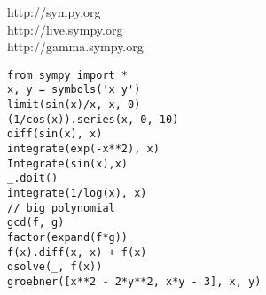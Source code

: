 \documentclass{article}
\begin{document}
\LARGE

\noindent
http://sympy.org \\
http://live.sympy.org \\
http://gamma.sympy.org \\

\begin{verbatim}
from sympy import *
x, y = symbols('x y')
limit(sin(x)/x, x, 0)
(1/cos(x)).series(x, 0, 10)
diff(sin(x), x)
integrate(exp(-x**2), x)
Integrate(sin(x),x)
_.doit()
integrate(1/log(x), x)
// big polynomial
gcd(f, g)
factor(expand(f*g))
f(x).diff(x, x) + f(x)
dsolve(_, f(x))
groebner([x**2 - 2*y**2, x*y - 3], x, y)
\end{verbatim}
\end{document}

